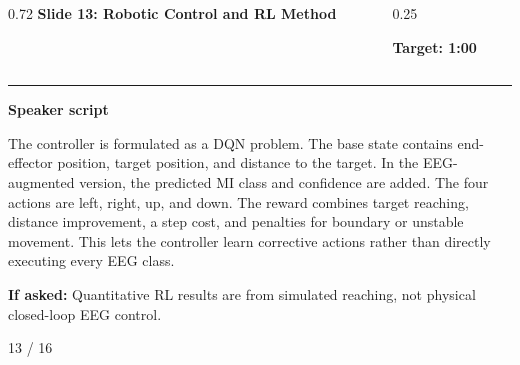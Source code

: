 \documentclass[aspectratio=169,10pt]{beamer}
\begin{document}
\begin{frame}[plain]
\vspace*{0.16cm}
\begin{columns}[T,totalwidth=\textwidth]
\begin{column}{0.72\textwidth}
{\fontsize{17}{18.5}\selectfont\bfseries Slide 13: Robotic Control and RL Method}
\end{column}
\begin{column}{0.25\textwidth}
\raggedleft
\colorbox{noteCream}{\parbox{0.88\linewidth}{\centering\bfseries Target: 1:00}}
\end{column}
\end{columns}
\vspace{0.10cm}
{\color{uomPurple}\rule{\textwidth}{1.2pt}}
\vspace{0.18cm}
{\color{uomPurple}\bfseries Speaker script}
\vspace{0.06cm}
\setlength{\fboxsep}{6pt}
\noindent\colorbox{panelGrey}{\begin{minipage}{0.94\textwidth}
\justifying\fontsize{11.0}{13.4}\selectfont
The controller is formulated as a DQN problem. The base state contains end-effector position, target position, and distance to the target. In the EEG-augmented version, the predicted MI class and confidence are added. The four actions are left, right, up, and down. The reward combines target reaching, distance improvement, a step cost, and penalties for boundary or unstable movement. This lets the controller learn corrective actions rather than directly executing every EEG class.
\end{minipage}}
\vspace{0.22cm}
\noindent\colorbox{noteCream}{\begin{minipage}{0.94\textwidth}
\fontsize{9.6}{11.6}\selectfont
{\bfseries If asked:} Quantitative RL results are from simulated reaching, not physical closed-loop EEG control.
\end{minipage}}
\vfill
\hfill{\color{textDark}\scriptsize 13 / 16}
\end{frame}
\end{document}
